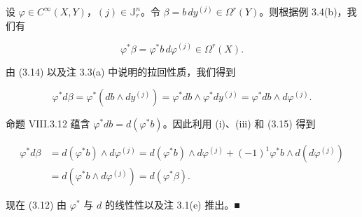 \begin{theorem}
\begin{items}
设 $ \varphi \in C^{\infty}(X, Y) $，$ (j) \in \mathbb{J}_{r}^{n} $。令 $ \beta = b\,dy^{(j)} \in \Omega^{r}(Y) $。则根据例 3.4(b)，我们有

\begin{equation}
\varphi^{*}\beta = \varphi^{*}b\,d\varphi^{(j)} \in \Omega^{r}(X).\tag{3.15}
\end{equation}

由 (3.14) 以及注 3.3(a) 中说明的拉回性质，我们得到

\[
\varphi^{*}d\beta = \varphi^{*}(db \wedge dy^{(j)}) = \varphi^{*}db \wedge \varphi^{*}dy^{(j)} = \varphi^{*}db \wedge d\varphi^{(j)}.
\]

命题 VIII.3.12 蕴含 $ \varphi^{*}db = d(\varphi^{*}b) $。因此利用 (i)、(iii) 和 (3.15) 得到

\begin{equation*}
\begin{aligned}
\varphi^{*}d\beta &= d(\varphi^{*}b) \wedge d\varphi^{(j)} = d(\varphi^{*}b) \wedge d\varphi^{(j)} + (-1)^{1}\varphi^{*}b \wedge d(d\varphi^{(j)}) \\ &= d(\varphi^{*}b \wedge d\varphi^{(j)}) = d(\varphi^{*}\beta).
\end{aligned}
\end{equation*}

现在 (3.12) 由 $ \varphi^{*} $ 与 $ d $ 的线性性以及注 3.1(e) 推出。\nobreak\hspace{0.35em}■

\end{items}

\end{theorem}

